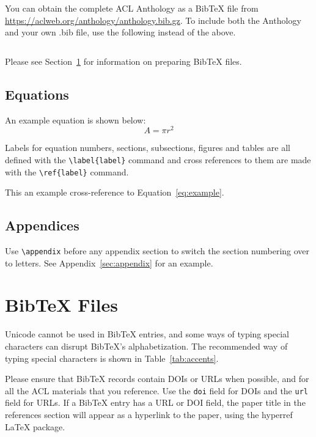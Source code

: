 \documentclass[11pt, a4paper, logo, copyright]{dmml}
\begin{document}
You can obtain the complete ACL Anthology as a Bib\TeX{} file from \url{https://aclweb.org/anthology/anthology.bib.gz}.
To include both the Anthology and your own .bib file, use the following instead of the above.
\begin{quote}
\begin{verbatim}

\end{verbatim}
\end{quote}

Please see Section~\ref{sec:bibtex} for information on preparing Bib\TeX{} files.

\subsection{Equations}

An example equation is shown below:
\begin{equation}
  \label{eq:example}
  A = \pi r^2
\end{equation}

Labels for equation numbers, sections, subsections, figures and tables
are all defined with the \verb|\label{label}| command and cross references
to them are made with the \verb|\ref{label}| command.

This an example cross-reference to Equation~\ref{eq:example}.

\subsection{Appendices}

Use \verb|\appendix| before any appendix section to switch the section numbering over to letters. See Appendix~\ref{sec:appendix} for an example.

\section{Bib\TeX{} Files}
\label{sec:bibtex}

Unicode cannot be used in Bib\TeX{} entries, and some ways of typing special characters can disrupt Bib\TeX's alphabetization. The recommended way of typing special characters is shown in Table~\ref{tab:accents}.

Please ensure that Bib\TeX{} records contain DOIs or URLs when possible, and for all the ACL materials that you reference.
Use the \verb|doi| field for DOIs and the \verb|url| field for URLs.
If a Bib\TeX{} entry has a URL or DOI field, the paper title in the references section will appear as a hyperlink to the paper, using the hyperref \LaTeX{} package.
\end{document}
